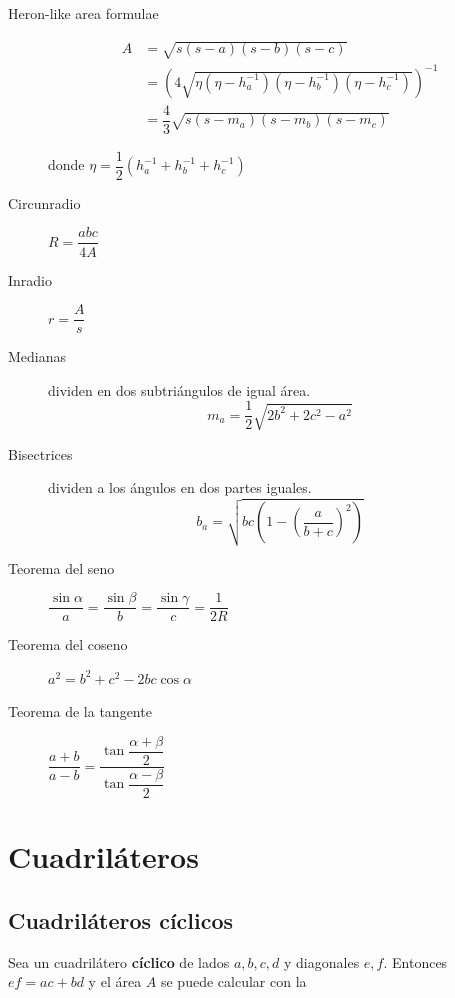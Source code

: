 \begin{description}
	\item[Heron-like area formulae]
		\begin{align*} 
		A &= \sqrt{s(s-a)(s-b)(s-c)}\\
			&= \left( 4 \sqrt{\eta (\eta - h_a^{-1}) (\eta - h_b^{-1}) (\eta - h_c^{-1})} \right)^{-1} \\
			&= \dfrac{4}{3} \sqrt{s(s - m_a)(s - m_b)(s - m_c)}
		\end{align*}
		
		donde $\eta = \dfrac{1}{2} (h_a^{-1} + h_b^{-1} + h_c^{-1})$
	\item[Circunradio] $R = \dfrac{abc}{4A}$
	\item[Inradio] $r=\dfrac{A}{s}$
	\item[Medianas] dividen en dos subtriángulos de igual área. %
		\begin{equation}
			\tag{teorema de Apolonio}
			m_a=\dfrac{1}{2}\sqrt{2b^2 + 2c^2 - a^2}
		\end{equation}
	\item[Bisectrices] dividen a los ángulos en dos partes iguales.
		\[ b_a=\sqrt{bc\left(1-\left(\dfrac{a}{b+c}\right)^2\right)}\]
	\item[Teorema del seno]
	$ \dfrac{\sin\alpha}{a}=\dfrac{\sin\beta}{b}=\dfrac{\sin\gamma}{c}=\dfrac{1}{2R}$
	\item[Teorema del coseno]
	$ a^2=b^2+c^2-2bc\cos\alpha $
	\item[Teorema de la tangente]
	$ \dfrac{a+b}{a-b}=\dfrac{\tan\dfrac{\alpha+\beta}{2}}{\tan\dfrac{\alpha-\beta}{2}} $
\end{description}

\section{Cuadriláteros}

	\subsection{Cuadriláteros cíclicos}
	Sea un cuadrilátero \textbf{cíclico} de lados $a, b, c, d$ y diagonales $e, f$. Entonces $ef = ac + bd$ y el área $A$ se puede calcular con la
	
